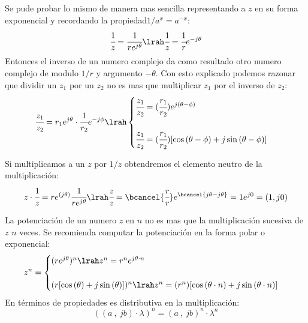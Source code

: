 \begin{itemize}
    Se pude probar lo mismo de manera mas sencilla representando a $z$ en su forma exponencial y recordando la propiedad$1/a^x=a^{-x}$:
    \begin{equation}
        \cfrac{1}{z}=\cfrac{1}{re^{j\theta}} \lrah \cfrac{1}{z}=\cfrac{1}{r}e^{-j\theta}
    \end{equation}
    Entonces el inverso de un numero complejo da como resultado otro numero complejo de modulo $1/r$ y argumento $-\theta$.
    Con esto explicado podemos razonar que  dividir un $z_1$ por un $z_2$ no es mas que multiplicar $z_1$ por el inverso de $z_2$:
    \begin{equation}
        \cfrac{z_1}{z_2}= r_1e^{j\theta}\cdot \cfrac{1}{r_2}e^{-j\phi} \lrah 
        \begin{cases}
            \cfrac{z_1}{z_2} = (\cfrac{r_1}{r_2})e^{j(\theta-\phi)}\\
            \\
            \cfrac{z_1}{z_2} =(\cfrac{r_1}{r_2})[\cos{(\theta -\phi)}+j \sin{(\theta -\phi})] 
        \end{cases}
    \end{equation}
    
    Si multiplicamos a un $z$ por $1/z$ obtendremos el elemento neutro de la multiplicación:
     \begin{equation}
        z\cdot \cfrac{1}{z}=re^{(j\theta)}\cfrac{1}{re^{j\theta}} \lrah \cfrac{z}{z}=\bcancel{\cfrac{r}{r}}e^{\bcancel{j\theta-j\theta}} = 1e^{j0} = (1,j0)
    \end{equation}
    
    \end{itemize}
    La potenciación de un numero $z$ en $n$ no es mas que la multiplicación sucesiva de $z$ $n$ veces. Se recomienda computar la potenciación en la forma polar o exponencial:
    \begin{equation}\label{eq:defPot}
        z^n=\begin{cases}
        (re^{j\theta})^n \lrah z^n =r^ne^{j\theta \cdot n} \\
        \\
        (r[\cos{(\theta)}+j\sin{(\theta)}])^n \lrah z^n = (r^n)[\cos{(\theta \cdot n)}+j \sin{(\theta \cdot n})]
        \end{cases}
    \end{equation}
    En términos de propiedades es distributiva en la multiplicación:
    \begin{equation}
        ((a\ ,\ jb)\cdot \lambda)^n = (a\ ,\ jb)^n\cdot \lambda^n
    \end{equation}
